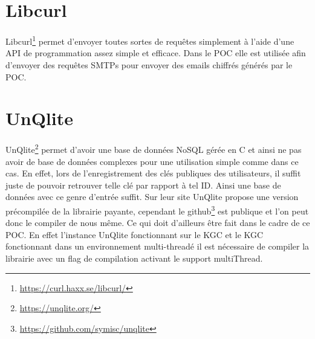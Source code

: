 \section{Libcurl}
Libcurl\footnote{\url{https://curl.haxx.se/libcurl/}} permet d'envoyer toutes sortes de requêtes simplement à l'aide d'une API de programmation assez simple et efficace. Dans le POC elle est utilisée afin d'envoyer des requêtes SMTPs pour envoyer des emails chiffrés générés par le POC.
\section{UnQlite}
UnQlite\footnote{\url{https://unqlite.org/}} permet d'avoir une base de données NoSQL gérée en C et ainsi ne pas avoir de base de données complexes pour une utilisation simple comme dans ce cas. En effet, lors de l'enregistrement des clés publiques des utilisateurs, il suffit juste de pouvoir retrouver telle clé par rapport à tel ID. Ainsi une base de données avec ce genre d'entrée suffit. Sur leur site UnQlite propose une version précompilée de la librairie payante, cependant le github\footnote{\url{https://github.com/symisc/unqlite}} est publique et l'on peut donc le compiler de nous même. Ce qui doit d'ailleurs être fait dans le cadre de ce POC. En effet l'instance UnQlite fonctionnant sur le KGC et le KGC fonctionnant dans un environnement multi-threadé il est nécessaire de compiler la librairie avec un flag de compilation activant le support multiThread.
